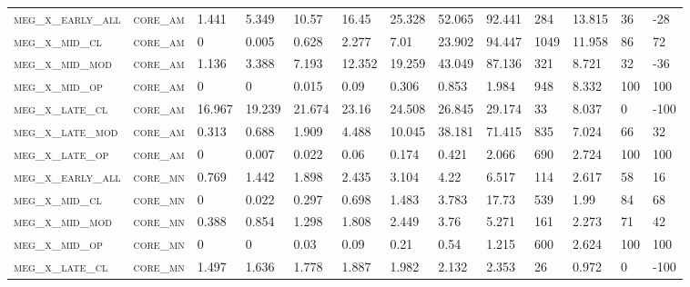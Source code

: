 \begin{landscape}
\begin{center}
\begin{footnotesize}
\begin{longtable}{lllllllllllll}
\textsc{meg\_x\_early\_all} & \textsc{core\_am  }   & 1.441    & 5.349    & 10.57    & 16.45    & 25.328   & 52.065   & 92.441    & 284    & 13.815        & 36            & -28           \\
\textsc{meg\_x\_mid\_cl   } & \textsc{core\_am  }   & 0        & 0.005    & 0.628    & 2.277    & 7.01     & 23.902   & 94.447    & 1049   & 11.958        & 86            & 72            \\
\textsc{meg\_x\_mid\_mod  } & \textsc{core\_am  }   & 1.136    & 3.388    & 7.193    & 12.352   & 19.259   & 43.049   & 87.136    & 321    & 8.721         & 32            & -36           \\
\textsc{meg\_x\_mid\_op   } & \textsc{core\_am  }   & 0        & 0        & 0.015    & 0.09     & 0.306    & 0.853    & 1.984     & 948    & 8.332         & 100           & 100           \\
\textsc{meg\_x\_late\_cl  } & \textsc{core\_am  }   & 16.967   & 19.239   & 21.674   & 23.16    & 24.508   & 26.845   & 29.174    & 33     & 8.037         & 0             & -100          \\
\textsc{meg\_x\_late\_mod } & \textsc{core\_am  }   & 0.313    & 0.688    & 1.909    & 4.488    & 10.045   & 38.181   & 71.415    & 835    & 7.024         & 66            & 32            \\
\textsc{meg\_x\_late\_op  } & \textsc{core\_am  }   & 0        & 0.007    & 0.022    & 0.06     & 0.174    & 0.421    & 2.066     & 690    & 2.724         & 100           & 100           \\
\textsc{meg\_x\_early\_all} & \textsc{core\_mn  }   & 0.769    & 1.442    & 1.898    & 2.435    & 3.104    & 4.22     & 6.517     & 114    & 2.617         & 58            & 16            \\
\textsc{meg\_x\_mid\_cl   } & \textsc{core\_mn  }   & 0        & 0.022    & 0.297    & 0.698    & 1.483    & 3.783    & 17.73     & 539    & 1.99          & 84            & 68            \\
\textsc{meg\_x\_mid\_mod  } & \textsc{core\_mn  }   & 0.388    & 0.854    & 1.298    & 1.808    & 2.449    & 3.76     & 5.271     & 161    & 2.273         & 71            & 42            \\
\textsc{meg\_x\_mid\_op   } & \textsc{core\_mn  }   & 0        & 0        & 0.03     & 0.09     & 0.21     & 0.54     & 1.215     & 600    & 2.624         & 100           & 100           \\
\textsc{meg\_x\_late\_cl  } & \textsc{core\_mn  }   & 1.497    & 1.636    & 1.778    & 1.887    & 1.982    & 2.132    & 2.353     & 26     & 0.972         & 0             & -100          \\

\end{longtable}
\end{footnotesize}
\end{center}
\end{landscape}
